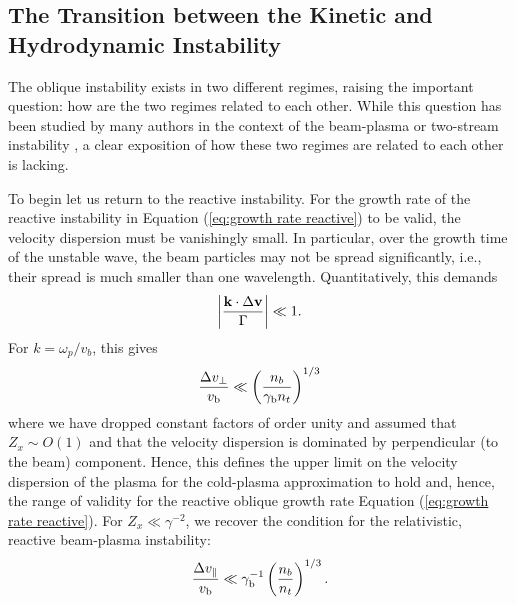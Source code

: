 \documentclass[usenatbib,iop,apj,numberedappendix]{aeb_emulateapj_2015}
\newcommand\ab[1]{{\color{green} \bf #1}} %
\newcommand\bmath[1] {\mbox{\boldmath$\rm #1$}}
\newcommand{\vel}{\ensuremath{\bmath{v}}}
\newcommand{\kvec}{\ensuremath{\bmath{k}}}
\newcommand{\gammabeam}{\ensuremath{\gamma_{\rm b}}}
\newcommand{\vbeam}{\ensuremath{v_{\rm b}}}
\begin{document}
\subsection{The Transition between the Kinetic and Hydrodynamic Instability}\label{sec:transition}

The oblique instability exists in two different regimes, raising the important question: how are the two regimes related to each other. While this question has been studied by many authors in the context of the beam-plasma or two-stream instability \citep[see for instance][]{Melrose86,Boyd},  a clear exposition of how these two regimes are related to each other is lacking.  

To begin let us return to the reactive instability.  For the growth rate of the reactive instability in Equation (\ref{eq:growth rate reactive}) to be valid, the velocity dispersion must be vanishingly small. In particular, over the growth time of the unstable wave, the beam particles may not be spread significantly, i.e., their spread is much smaller than one wavelength.  Quantitatively, this demands
\begin{equation}
 \left|\frac{\kvec\cdot\Delta \vel}{\Gamma}\right| \ll 1.
\end{equation}
For $k = \omega_p/v_b$, this gives
\begin{equation}\label{eq:oblique reactive regime}
 \frac{\Delta v_{\perp}}{\vbeam} \ll \left(\frac{n_b}{\gammabeam n_t}\right)^{1/3}
\end{equation}
where we have dropped constant factors of order unity and assumed that $Z_x \sim O(1)$ and that the velocity dispersion is dominated by perpendicular (to the beam) component.  Hence, this defines the upper limit on the velocity dispersion of the plasma for the cold-plasma approximation to hold and, hence, the range of validity for the reactive oblique growth rate Equation (\ref{eq:growth rate reactive}).  For $Z_x \ll \gamma^{-2}$, we recover the condition for the relativistic, reactive beam-plasma instability:
\begin{equation}\label{eq:bp reactive regime}
\frac{\Delta v_{\parallel}}{\vbeam} \ll \gammabeam^{-1}\left(\frac{n_b}{n_t}\right)^{1/3}.
\end{equation}
\end{document}
